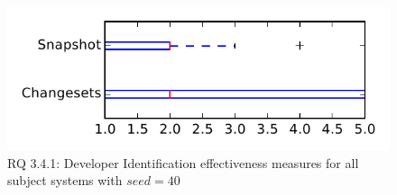 
\begin{figure}
\centering
\includegraphics[height=0.4\textheight]{figures/dit_seed/rq1_tiny_40}
\caption{RQ 3.4.1: Developer Identification effectiveness measures for all subject systems with $seed=40$}
\label{fig:dit_seed:rq1:tiny}
\end{figure}
